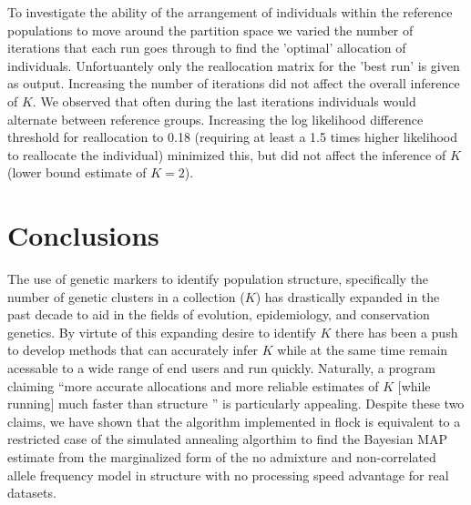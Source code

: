 To investigate the ability of the arrangement of individuals within the reference 
populations to move around the partition space we varied the number of iterations that 
each run goes through to find the 'optimal' allocation of individuals. Unfortuantely 
only the reallocation matrix for the 'best run' is given as output. Increasing the 
number of iterations did not affect the overall inference of $K$. We 
observed that often during the last iterations individuals would alternate between 
reference groups. Increasing the log likelihood 
difference threshold for reallocation to 0.18 (requiring at least a 1.5 times 
higher likelihood to reallocate the individual) minimized this, but did not affect the 
inference of $K$ (lower bound estimate of $K = 2$).

\section*{Conclusions}
The use of genetic markers to identify population structure, specifically
the number of genetic clusters in a collection ($K$) has drastically expanded
in the past decade to aid in the fields of evolution, epidemiology, and conservation
genetics. By virtute of this expanding desire to identify $K$ there has been a push to 
develop methods that can accurately infer $K$ while at the same time remain acessable
to a wide range of end users and run quickly. Naturally, a program claiming
``more accurate allocations and more reliable estimates of $K$ [while running]
much faster than {\sc structure} \citep[][p.~734]{Duc&Tur2012}'' is particularly 
appealing. Despite these two claims, we have shown that the algorithm implemented 
in {\sc flock} is equivalent to 
a restricted case of the simulated annealing algorthim to find the Bayesian 
MAP estimate from the marginalized form of the no admixture and non-correlated
allele frequency model in {\sc structure} with no processing speed advantage for real datasets. 

